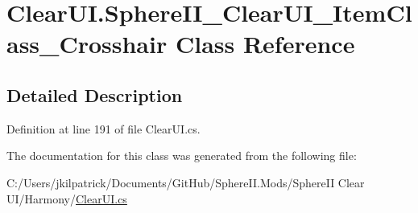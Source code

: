 \hypertarget{class_clear_u_i_1_1_sphere_i_i___clear_u_i___item_class___crosshair}{}\section{Clear\+U\+I.\+Sphere\+I\+I\+\_\+\+Clear\+U\+I\+\_\+\+Item\+Class\+\_\+\+Crosshair Class Reference}
\label{class_clear_u_i_1_1_sphere_i_i___clear_u_i___item_class___crosshair}


\subsection{Detailed Description}


Definition at line 191 of file Clear\+U\+I.\+cs.



The documentation for this class was generated from the following file\+:\begin{DoxyCompactItemize}
\item 
C\+:/\+Users/jkilpatrick/\+Documents/\+Git\+Hub/\+Sphere\+I\+I.\+Mods/\+Sphere\+I\+I Clear U\+I/\+Harmony/\mbox{\hyperlink{_clear_u_i_8cs}{Clear\+U\+I.\+cs}}\end{DoxyCompactItemize}
